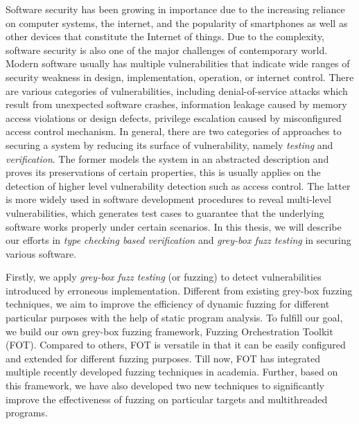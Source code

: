 
Software security has been growing in importance due to the increasing reliance on computer systems, the internet, and the popularity of smartphones as well as other devices that constitute the Internet of things. Due to the complexity, software security is also one of the major challenges of contemporary world. Modern software usually has multiple vulnerabilities that indicate wide ranges of security weakness in design, implementation, operation, or internet control. There are various categories of vulnerabilities, including denial-of-service attacks which result from unexpected software crashes, information leakage caused by memory access violations or design defects, privilege escalation caused by misconfigured access control mechanism. In general, there are two categories of approaches to securing a system by reducing its surface of vulnerability, namely \emph{testing} and \emph{verification}. The former models the system in an abstracted description and proves its preservations of certain properties, this is usually applies on the detection of higher level vulnerability detection such as access control. The latter is more widely used in software development procedures to reveal multi-level vulnerabilities, which generates test cases to guarantee that the underlying software works properly under certain scenarios. In this thesis, we will describe our efforts in \emph{type checking based verification} and \emph{grey-box fuzz testing} in securing various software.

Firstly, we apply \emph{grey-box fuzz testing} (or fuzzing) to detect vulnerabilities introduced by erroneous implementation. Different from existing grey-box fuzzing techniques, we aim to improve the efficiency of dynamic fuzzing for different particular purposes with the help of static program analysis. To fulfill our goal, we build our own grey-box fuzzing framework, Fuzzing Orchestration Toolkit (FOT). Compared to others, FOT is versatile in that it can be easily configured and extended for different fuzzing purposes. Till now, FOT has integrated multiple recently developed fuzzing techniques in academia. Further, based on this framework, we have also developed two new techniques to significantly improve the effectiveness of fuzzing on particular targets and multithreaded programs.


